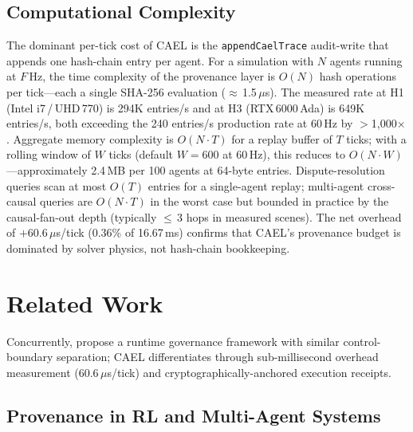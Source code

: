 \documentclass[sigconf,nonacm]{acmart}
\begin{document}
\subsection{Computational Complexity}
\label{sec:complexity}

The dominant per-tick cost of CAEL is the \texttt{appendCaelTrace} audit-write
that appends one hash-chain entry per agent.  For a simulation with $N$ agents
running at $F$\,Hz, the time complexity of the provenance layer is $O(N)$ hash
operations per tick---each a single SHA-256 evaluation ($\approx$\,1.5\,$\mu$s).
The measured rate at H1 (Intel i7\,/\,UHD\,770) is 294K entries/s and at H3
(RTX\,6000\,Ada) is 649K entries/s, both exceeding
the 240 entries/s production rate at 60\,Hz by $>$1,000$\times$.  Aggregate
memory complexity is $O(N \cdot T)$ for a replay buffer of $T$ ticks; with a
rolling window of $W$ ticks (default $W = 600$ at 60\,Hz), this reduces to
$O(N \cdot W)$---approximately 2.4\,MB per 100 agents at 64-byte entries.
Dispute-resolution queries scan at most $O(T)$ entries for a single-agent replay;
multi-agent cross-causal queries are $O(N \cdot T)$ in the worst case but
bounded in practice by the causal-fan-out depth (typically $\leq$\,3 hops in
measured scenes).  The net overhead of $+60.6\,\mu$s/tick (0.36\% of 16.67\,ms)
confirms that CAEL's provenance budget is dominated by solver physics, not
hash-chain bookkeeping.

\section{Related Work}
\label{sec:related}

Concurrently, \citet{harnessingembodied2026} propose a runtime governance framework with similar control-boundary separation; CAEL differentiates through sub-millisecond overhead measurement ($60.6\,\mu$s/tick) and cryptographically-anchored execution receipts.

\subsection{Provenance in RL and Multi-Agent Systems}
\end{document}
